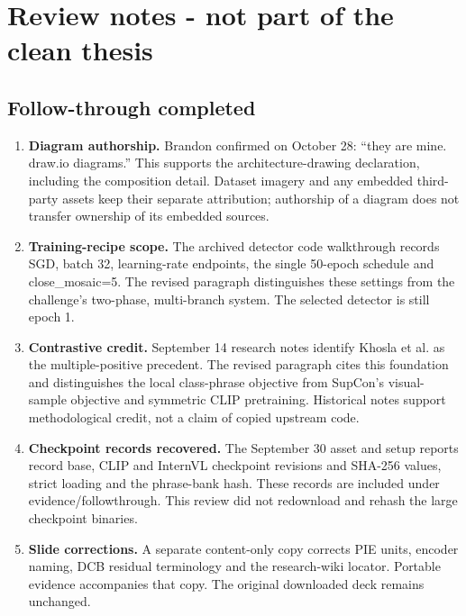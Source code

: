 \clearpage
\chapter*{Review notes - not part of the clean thesis}
\section*{Follow-through completed}
\begin{enumerate}
\item \textbf{Diagram authorship.} Brandon confirmed on October 28: ``they are mine. draw.io diagrams.'' This supports the architecture-drawing declaration, including the composition detail. Dataset imagery and any embedded third-party assets keep their separate attribution; authorship of a diagram does not transfer ownership of its embedded sources.
\item \textbf{Training-recipe scope.} The archived detector code walkthrough records SGD, batch 32, learning-rate endpoints, the single 50-epoch schedule and close\_mosaic=5. The revised paragraph distinguishes these settings from the challenge's two-phase, multi-branch system. The selected detector is still epoch 1.
\item \textbf{Contrastive credit.} September 14 research notes identify Khosla et al. as the multiple-positive precedent. The revised paragraph cites this foundation and distinguishes the local class-phrase objective from SupCon's visual-sample objective and symmetric CLIP pretraining. Historical notes support methodological credit, not a claim of copied upstream code.
\item \textbf{Checkpoint records recovered.} The September 30 asset and setup reports record base, CLIP and InternVL checkpoint revisions and SHA-256 values, strict loading and the phrase-bank hash. These records are included under evidence/followthrough. This review did not redownload and rehash the large checkpoint binaries.
\item \textbf{Slide corrections.} A separate content-only copy corrects PIE units, encoder naming, DCB residual terminology and the research-wiki locator. Portable evidence accompanies that copy. The original downloaded deck remains unchanged.
\end{enumerate}
